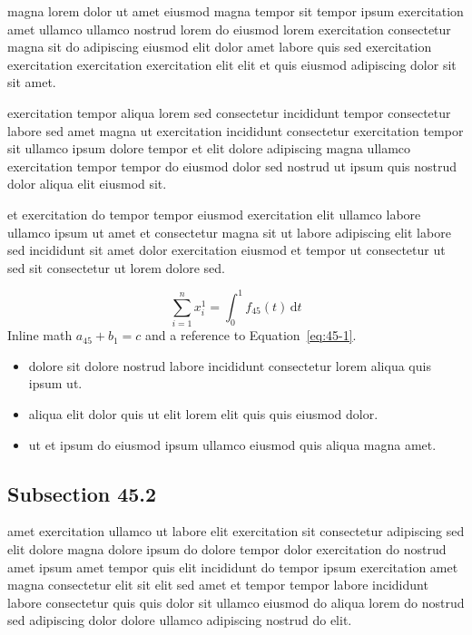 \documentclass{article}
\begin{document}
magna lorem dolor ut amet eiusmod magna tempor sit tempor ipsum exercitation amet ullamco ullamco nostrud lorem do eiusmod lorem exercitation consectetur magna sit do adipiscing eiusmod elit dolor amet labore quis sed exercitation exercitation exercitation exercitation elit elit et quis eiusmod adipiscing dolor sit sit amet.

exercitation tempor aliqua lorem sed consectetur incididunt tempor consectetur labore sed amet magna ut exercitation incididunt consectetur exercitation tempor sit ullamco ipsum dolore tempor et elit dolore adipiscing magna ullamco exercitation tempor tempor do eiusmod dolor sed nostrud ut ipsum quis nostrud dolor aliqua elit eiusmod sit.

et exercitation do tempor tempor eiusmod exercitation elit ullamco labore ullamco ipsum ut amet et consectetur magna sit ut labore adipiscing elit labore sed incididunt sit amet dolor exercitation eiusmod et tempor ut consectetur ut sed sit consectetur ut lorem dolore sed.

\begin{equation}\label{eq:45-1}
  \sum_{i=1}^{n} x_i^{1} = \int_0^1 f_{45}(t)\,\mathrm{d}t
\end{equation}
Inline math $a_{45} + b_{1} = c$ and a reference to Equation~\eqref{eq:45-1}.

\begin{itemize}
  \item dolore sit dolore nostrud labore incididunt consectetur lorem aliqua quis ipsum ut.
  \item aliqua elit dolor quis ut elit lorem elit quis quis eiusmod dolor.
  \item ut et ipsum do eiusmod ipsum ullamco eiusmod quis aliqua magna amet.
\end{itemize}

\subsection{Subsection 45.2}\label{sec:45-2}
amet exercitation ullamco ut labore elit exercitation sit consectetur adipiscing sed elit dolore magna dolore ipsum do dolore tempor dolor exercitation do nostrud amet ipsum amet tempor quis elit incididunt do tempor ipsum exercitation amet magna consectetur elit sit elit sed amet et tempor tempor labore incididunt labore consectetur quis quis dolor sit ullamco eiusmod do aliqua lorem do nostrud sed adipiscing dolor dolore ullamco adipiscing nostrud do elit.
\end{document}
